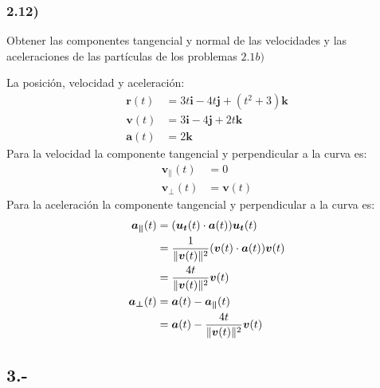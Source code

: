 \documentclass{article}
\DeclarePairedDelimiter{\norm}{\lVert}{\rVert}
\begin{document}
\subsubsection*{2.12)}
Obtener las componentes tangencial y normal de las velocidades y las aceleraciones
de las partículas de los problemas $2.1 b)$
\begin{tcolorbox}
    La posición, velocidad y aceleración:
    \begin{align*}
        \bm{r}(t) &=  3t\bm{i} - 4t\bm{j} + (t^2+3)\bm{k} \\
        \bm{v}(t) &= 3\bm{i} - 4\bm{j} + 2t\bm{k} \\
        \bm{a}(t) &= 2\bm{k}
    \end{align*}
    Para la velocidad la componente tangencial y perpendicular a la curva es:
    \begin{align*}
        \bm{v_\parallel}(t) &= 0 \\ 
        \bm{v_\bot}(t) &= \bm{v}(t)
    \end{align*}
    Para la aceleración la componente tangencial y perpendicular a la curva es:
    \begin{align*}
        \bm{a_\parallel}(t) 
        &= (\bm{u_t}(t) \cdot \bm{a}(t)) \bm{u_t}(t) \\
        &= \frac{1}{\norm{\bm{v}(t)}^2} (\bm{v}(t) \cdot \bm{a}(t))\bm{v}(t) \\
        &= \frac{4t}{\norm{\bm{v}(t)}^2}\bm{v}(t) \\
        \bm{a_\bot}(t) 
        &= \bm{a}(t) - \bm{a_\parallel}(t) \\
        &= \bm{a}(t) - \frac{4t}{\norm{\bm{v}(t)}^2}\bm{v}(t)
    \end{align*}       
    \end{tcolorbox}

\subsection*{3.-}
\end{document}
